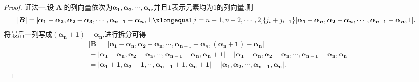 \documentclass[lang=cn,newtx,10pt,scheme=chinese]{elegantbook}
\begin{document}
  \begin{proof}
      {\color{blue}证法一:}设\(|\boldsymbol{A}|\)的列向量依次为\(\boldsymbol{\alpha }_{\mathbf{1}},\boldsymbol{\alpha }_{\mathbf{2}},\cdots ,\boldsymbol{\alpha }_{\boldsymbol{n}}\),并且\(\mathbf{1}\)表示元素均为\(1\)的列向量.则
      \begin{align*}
          |\boldsymbol{B}|=|\boldsymbol{\alpha }_{\mathbf{1}}-\boldsymbol{\alpha }_{\mathbf{2}},\boldsymbol{\alpha }_{\mathbf{2}}-\boldsymbol{\alpha }_{\mathbf{3}},\cdots ,\boldsymbol{\alpha }_{\boldsymbol{n}-\mathbf{1}}-\boldsymbol{\alpha }_{\boldsymbol{n}},1|\xlongequal[i=n-1,n-2,\cdots ,2]{j_i+j_{i-1}}|\boldsymbol{\alpha }_{\mathbf{1}}-\boldsymbol{\alpha }_{\boldsymbol{n}},\boldsymbol{\alpha }_{\mathbf{2}}-\boldsymbol{\alpha }_{\boldsymbol{n}},\cdots ,\boldsymbol{\alpha }_{\boldsymbol{n}-\mathbf{1}}-\boldsymbol{\alpha }_{\boldsymbol{n}},1|.        
      \end{align*}
      将最后一列写成\((\boldsymbol{\alpha}_{\boldsymbol{n}} + \mathbf{1}) - \boldsymbol{\alpha}_{\boldsymbol{n}}\),进行拆分可得
      \begin{align*}
          &|\boldsymbol{B}| = |\boldsymbol{\alpha}_{\boldsymbol{1}} - \boldsymbol{\alpha}_{\boldsymbol{n}},\boldsymbol{\alpha}_{\boldsymbol{2}} - \boldsymbol{\alpha}_{\boldsymbol{n}},\cdots,\boldsymbol{\alpha}_{\boldsymbol{n - 1}} - \boldsymbol{\alpha}_n,(\boldsymbol{\alpha}_{\boldsymbol{n}} + \mathbf{1}) - \boldsymbol{\alpha}_{\boldsymbol{n}}|
          \\
          &= |\boldsymbol{\alpha}_{\boldsymbol{1}} - \boldsymbol{\alpha}_{\boldsymbol{n}},\boldsymbol{\alpha}_{\boldsymbol{2}} - \boldsymbol{\alpha}_{\boldsymbol{n}},\cdots,\boldsymbol{\alpha}_{\boldsymbol{n - 1}} - \boldsymbol{\alpha}_{\boldsymbol{n}},\boldsymbol{\alpha}_{\boldsymbol{n}} + \mathbf{1}| - |\boldsymbol{\alpha}_{\boldsymbol{1}} - \boldsymbol{\alpha}_{\boldsymbol{n}},\boldsymbol{\alpha}_{\boldsymbol{2}} - \boldsymbol{\alpha}_{\boldsymbol{n}},\cdots,\boldsymbol{\alpha}_{\boldsymbol{n - 1}} - \boldsymbol{\alpha}_{\boldsymbol{n}},\boldsymbol{\alpha}_{\boldsymbol{n}}|
          \\
          &= |\boldsymbol{\alpha}_{\boldsymbol{1}} + \mathbf{1},\boldsymbol{\alpha}_{\boldsymbol{2}} + \mathbf{1},\cdots,\boldsymbol{\alpha}_{\boldsymbol{n - 1}} + \mathbf{1},\boldsymbol{\alpha}_{\boldsymbol{n}} + \mathbf{1}| - |\boldsymbol{\alpha}_{\boldsymbol{1}},\boldsymbol{\alpha}_{\boldsymbol{2}},\cdots,\boldsymbol{\alpha}_{\boldsymbol{n-1}},\boldsymbol{\alpha}_{\boldsymbol{n}}|.
      \end{align*}

\end{proof}
\end{document}
